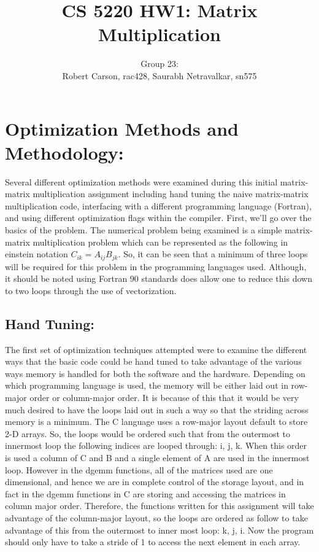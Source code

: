 \documentclass{article}
\begin{document}
\title{CS 5220 HW1: Matrix Multiplication}
\author{Group 23: \\Robert Carson, rac428, Saurabh Netravalkar, sn575}
\renewcommand{\today}{1 Oct. 2015}
\maketitle

\section*{Optimization Methods and Methodology:} 

Several different optimization methods were examined during this initial matrix-matrix multiplication assignment including hand tuning the naive matrix-matrix multiplication code, interfacing with a different programming language (Fortran), and using different optimization flags within the compiler.  First, we'll go over the basics of the problem. The numerical problem being examined is a simple matrix-matrix multiplication problem which can be represented as the following in einstein notation  $C_{ik} = A_{ij}B_{jk}$. 
So, it can be seen that a minimum of three loops will be required for this problem in the programming languages used. Although, it should be noted using Fortran 90 standards does allow one to reduce this down to two loops through the use of vectorization. 

\subsection*{Hand Tuning:}

The first set of optimization techniques attempted were to examine the different ways that the basic code could be hand tuned to take advantage of the various ways memory is handled for both the software and the hardware.  Depending on which programming language is used, the memory will be either laid out in row-major order or column-major order. It is because of this that it would be very much desired to have the loops laid out in such a way so that the striding across memory is a minimum. The C language uses a row-major layout default to store 2-D arrays.  So, the loops would be ordered such that from the outermost to innermost loop the following indices are looped through: i, j, k. When this order is used a column of C and B and a single element of A are used in the innermost loop. However in the dgemm functions, all of the matrices used are one dimensional, and hence we are in complete control of the storage layout, and in fact in the dgemm functions in C are storing and accessing the matrices in column major order.  Therefore, the functions written for this assignment will take advantage of the column-major layout, so the loops are ordered as follow to take advantage of this from the outermost to inner most loop: k, j, i. Now the program should only have to take a stride of 1 to access the next element in each array.
\end{document}
